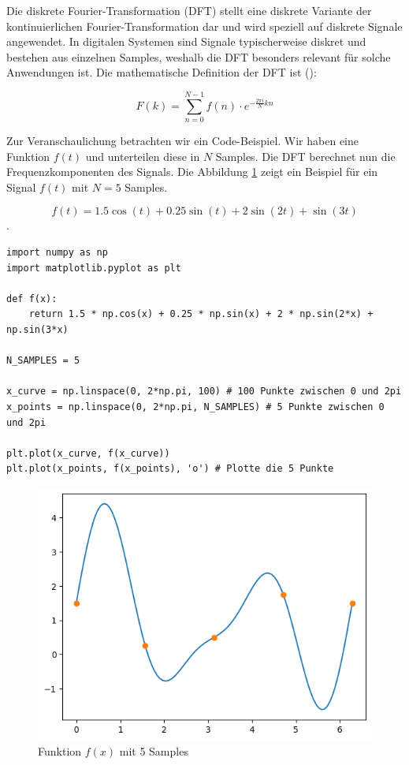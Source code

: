 \documentclass[11pt,a4paper]{article}
\begin{document}
Die diskrete Fourier-Transformation (DFT) stellt eine diskrete Variante der kontinuierlichen 
Fourier-Transformation dar und wird speziell auf diskrete Signale angewendet. In digitalen 
Systemen sind Signale typischerweise diskret und bestehen aus einzelnen Samples, weshalb die DFT 
besonders relevant für solche Anwendungen ist. Die mathematische Definition der DFT ist 
(\cite[Chapter~3]{hansen2014fourier}):

\[
F(k) = \sum_{n=0}^{N-1} f(n) \cdot e^{-\frac{2\pi i}{N} kn}
\]

\noindent
\newline
Zur Veranschaulichung betrachten wir ein Code-Beispiel. Wir haben eine Funktion \(f(t)\) und unterteilen
diese in \(N\) Samples. Die DFT berechnet nun die Frequenzkomponenten des Signals. Die Abbildung 
\ref{fig:dft_example} zeigt ein Beispiel für ein Signal \(f(t)\) mit \(N=5\) Samples.

\[ f(t) = 1.5 \cos(t) + 0.25 \sin(t) + 2 \sin(2t) + \sin(3t) \].


\begin{lstlisting}
import numpy as np
import matplotlib.pyplot as plt

def f(x):
    return 1.5 * np.cos(x) + 0.25 * np.sin(x) + 2 * np.sin(2*x) + np.sin(3*x)

N_SAMPLES = 5

x_curve = np.linspace(0, 2*np.pi, 100) # 100 Punkte zwischen 0 und 2pi
x_points = np.linspace(0, 2*np.pi, N_SAMPLES) # 5 Punkte zwischen 0 und 2pi

plt.plot(x_curve, f(x_curve))
plt.plot(x_points, f(x_points), 'o') # Plotte die 5 Punkte
\end{lstlisting}

\begin{figure}[h]
    \centering
    \includegraphics[width=0.60\linewidth]{img/dft.png}
    \caption{Funktion \( f(x) \) mit 5 Samples}
    \label{fig:dft_example}
\end{figure}
\end{document}
